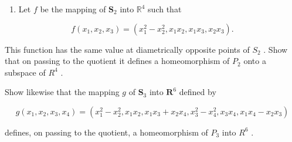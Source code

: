 \ExerciseSection

\begin{enumerate}
\def\labelenumi{\arabic{enumi})}
\tightlist
\item
  Let \(f\) be the mapping of \(\mathbf{S}_2\) into \(\mathbb{R}^4\) such that
\end{enumerate}

\[
f \left(x _ {1}, x _ {2}, x _ {3}\right) = \left(x _ {1} ^ {2} - x _ {2} ^ {2}, x _ {1} x _ {2}, x _ {1} x _ {3}, x _ {2} x _ {3}\right).
\]

This function has the same value at diametrically opposite points of \(S_{2}\) . Show that on passing to the quotient it defines a homeomorphism of \(P_{2}\) onto a subspace of \(R^{4}\) .

Show likewise that the mapping \(g\) of \(\mathbf{S}_3\) into \(\mathbf{R}^6\) defined by

\[
g \left(x _ {1}, x _ {2}, x _ {3}, x _ {4}\right) = \left(x _ {1} ^ {2} - x _ {2} ^ {2}, x _ {1} x _ {2}, x _ {1} x _ {3} + x _ {2} x _ {4}, x _ {3} ^ {2} - x _ {4} ^ {2}, x _ {3} x _ {4}, x _ {1} x _ {4} - x _ {2} x _ {3}\right)
\]

defines, on passing to the quotient, a homeomorphism of \(P_{3}\) into \(R^{6}\) .

